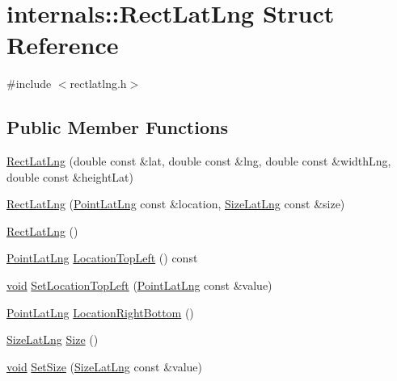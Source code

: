 \hypertarget{structinternals_1_1_rect_lat_lng}{\section{internals\-:\-:\-Rect\-Lat\-Lng \-Struct \-Reference}
\label{structinternals_1_1_rect_lat_lng}
}


{\ttfamily \#include $<$rectlatlng.\-h$>$}

\subsection*{\-Public \-Member \-Functions}
\begin{DoxyCompactItemize}
\item 
\hyperlink{group___o_p_map_widget_ga4ae20976d028402ff59ecd45b52214be}{\-Rect\-Lat\-Lng} (double const \&lat, double const \&lng, double const \&width\-Lng, double const \&height\-Lat)
\item 
\hyperlink{group___o_p_map_widget_gab62bfb97bab6213f9a6159d2f1c75d5d}{\-Rect\-Lat\-Lng} (\hyperlink{structinternals_1_1_point_lat_lng}{\-Point\-Lat\-Lng} const \&location, \hyperlink{structinternals_1_1_size_lat_lng}{\-Size\-Lat\-Lng} const \&size)
\item 
\hyperlink{group___o_p_map_widget_ga512c376dfebb298e064a143c262ac18f}{\-Rect\-Lat\-Lng} ()
\item 
\hyperlink{structinternals_1_1_point_lat_lng}{\-Point\-Lat\-Lng} \hyperlink{group___o_p_map_widget_gaed234223ec4033a1e269d271d032c9fa}{\-Location\-Top\-Left} () const 
\item 
\hyperlink{group___u_a_v_objects_plugin_ga444cf2ff3f0ecbe028adce838d373f5c}{void} \hyperlink{group___o_p_map_widget_gabe9e8daac2f01196b738c5590fe23b94}{\-Set\-Location\-Top\-Left} (\hyperlink{structinternals_1_1_point_lat_lng}{\-Point\-Lat\-Lng} const \&value)
\item 
\hyperlink{structinternals_1_1_point_lat_lng}{\-Point\-Lat\-Lng} \hyperlink{group___o_p_map_widget_gaa5faf64c8706dfbe274d2265f0d017ae}{\-Location\-Right\-Bottom} ()
\item 
\hyperlink{structinternals_1_1_size_lat_lng}{\-Size\-Lat\-Lng} \hyperlink{group___o_p_map_widget_ga9e982e2f84c0c4faf6fb0a09d57dc18b}{\-Size} ()
\item 
\hyperlink{group___u_a_v_objects_plugin_ga444cf2ff3f0ecbe028adce838d373f5c}{void} \hyperlink{group___o_p_map_widget_ga00d3530356a06affd5c53a39b5247030}{\-Set\-Size} (\hyperlink{structinternals_1_1_size_lat_lng}{\-Size\-Lat\-Lng} const \&value)

\end{DoxyCompactItemize}
